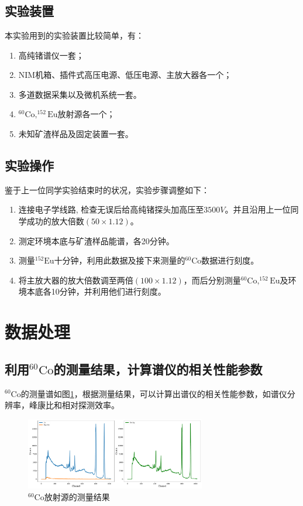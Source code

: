 \documentclass{article}
\begin{document}
\section{}
\subsection{实验装置}
本实验用到的实验装置比较简单，有：
\begin{enumerate}
    \item 高纯锗谱仪一套；
    \item NIM机箱、插件式高压电源、低压电源、主放大器各一个；
    \item 多道数据采集以及微机系统一套。
    \item $^{60}\text{Co},^{152}\text{Eu}$放射源各一个；
    \item 未知矿渣样品及固定装置一套。
\end{enumerate}
\subsection{实验操作}
鉴于上一位同学实验结束时的状况，实验步骤调整如下：
\begin{enumerate}
    \item 连接电子学线路,
检查无误后给高纯锗探头加高压至$3500\si{V}$。并且沿用上一位同学成功的放大倍数$(50\times1.12)$。
    \item 测定环境本底与矿渣样品能谱，各20分钟。
    \item 测量$^{152}\text{Eu}$十分钟，利用此数据及接下来测量的$^{60}\text{Co}$数据进行刻度。
    \item 将主放大器的放大倍数调至两倍$(100\times 1.12)$，而后分别测量$^{60}\text{Co},^{152}\text{Eu}$及环境本底各10分钟，并利用他们进行刻度。
\end{enumerate}
\section{数据处理}
\subsection{利用$^{60}\text{Co}$的测量结果，计算谱仪的相关性能参数}
$^{60}\text{Co}$的测量谱如图\ref{fig:60Co}，根据测量结果，可以计算出谱仪的相关性能参数，如谱仪分辨率，峰康比和相对探测效率。
\begin{figure}[htbp]
    \centering
    \includegraphics[width=0.7\textwidth]{../plots/Co_net.pdf}
    \caption{$^{60}\text{Co}$放射源的测量结果\label{fig:60Co}}
\end{figure}
\end{document}
